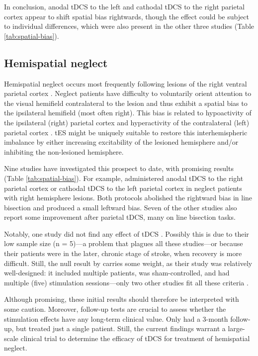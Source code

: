 \documentclass[11pt,]{memoir}
\begin{document}
In conclusion, anodal tDCS to the left and cathodal tDCS to the right parietal cortex appear to shift spatial bias rightwards, though the effect could be subject to individual differences, which were also present in the other three studies (Table \ref{tab:spatial-bias}).

\hypertarget{hemispatial-neglect}{%
\subsection{Hemispatial neglect}\label{hemispatial-neglect}}

Hemispatial neglect occurs most frequently following lesions of the right ventral parietal cortex \autocite{Vallar1986}. Neglect patients have difficulty to voluntarily orient attention to the visual hemifield contralateral to the lesion \autocite{Heilman2012} and thus exhibit a spatial bias to the ipsilateral hemifield (most often right). This bias is related to hypoactivity of the ipsilateral (right) parietal cortex and hyperactivity of the contralateral (left) parietal cortex \autocite{Corbetta2005}. tES might be uniquely suitable to restore this interhemispheric imbalance by either increasing excitability of the lesioned hemisphere and/or inhibiting the non-lesioned hemisphere.

Nine studies have investigated this prospect to date, with promising results (Table \ref{tab:spatial-bias}). For example, \textcite{Sparing2009} administered anodal tDCS to the right parietal cortex or cathodal tDCS to the left parietal cortex in neglect patients with right hemisphere lesions. Both protocols abolished the rightward bias in line bisection and produced a small leftward bias. Seven of the other studies also report some improvement after parietal tDCS, many on line bisection tasks.

Notably, one study did not find any effect of tDCS \autocite{Smit2015}. Possibly this is due to their low sample size (n = 5)---a problem that plagues all these studies---or because their patients were in the later, chronic stage of stroke, when recovery is more difficult. Still, the null result by \textcite{Smit2015} carries some weight, as their study was relatively well-designed: it included multiple patients, was sham-controlled, and had multiple (five) stimulation sessions---only two other studies fit all these criteria \autocites{Ladavas2015}{Yi2016}.

Although promising, these initial results should therefore be interpreted with some caution. Moreover, follow-up tests are crucial to assess whether the stimulation effects have any long-term clinical value. Only \textcite{Brem2014} had a 3-month follow-up, but treated just a single patient. Still, the current findings warrant a large-scale clinical trial to determine the efficacy of tDCS for treatment of hemispatial neglect.
\end{document}
